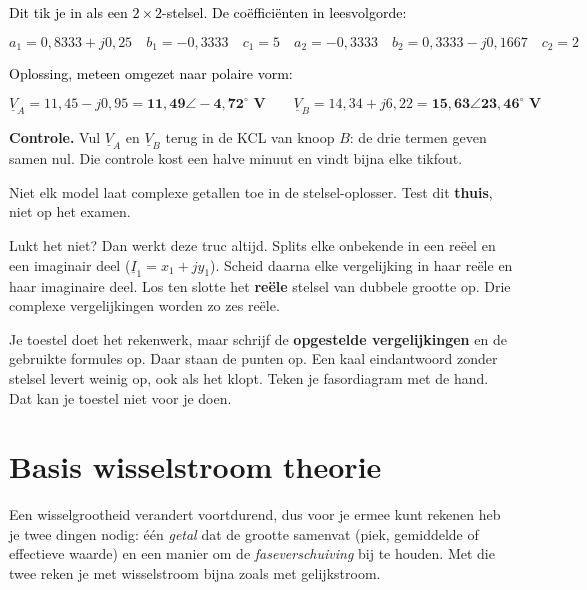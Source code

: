 \documentclass[a4paper,11pt]{article}
\newcommand{\stapreden}[1]{\par\vspace{1.4mm}\noindent\textcolor{black}{#1}\par\vspace{-2mm}}
\begin{document}
\begin{voorbeeld}
    \stapreden{Dit tik je in als een $2\times 2$-stelsel. De co\"effici\"enten in leesvolgorde:}
    \[a_1 = 0{,}8333+j0{,}25 \quad b_1 = -0{,}3333 \quad c_1 = 5 \quad
        a_2 = -0{,}3333 \quad b_2 = 0{,}3333-j0{,}1667 \quad c_2 = 2\]

    \stapreden{Oplossing, meteen omgezet naar polaire vorm:}
    \[\underline{V}_A = 11{,}45 - j0{,}95 = \mathbf{11{,}49\angle -4{,}72^\circ\text{ V}}
        \qquad
        \underline{V}_B = 14{,}34 + j6{,}22 = \mathbf{15{,}63\angle 23{,}46^\circ\text{ V}}\]

    \textbf{Controle.} Vul $\underline{V}_A$ en $\underline{V}_B$ terug in de KCL van knoop $B$:
    de drie termen geven samen nul. Die controle kost een halve minuut en vindt bijna elke tikfout.
\end{voorbeeld}

\begin{waarschuwing}
    Niet elk model laat complexe getallen toe in de stelsel-oplosser. Test dit \textbf{thuis}, niet
    op het examen.

    Lukt het niet? Dan werkt deze truc altijd. Splits elke onbekende in een re\"eel en een imaginair
    deel ($\underline{I}_1 = x_1 + jy_1$). Scheid daarna elke vergelijking in haar re\"ele en haar
    imaginaire deel. Los ten slotte het \textbf{re\"ele} stelsel van dubbele grootte op. Drie complexe
    vergelijkingen worden zo zes re\"ele.
\end{waarschuwing}

\begin{examenbox}
    Je toestel doet het rekenwerk, maar schrijf de \textbf{opgestelde vergelijkingen} en de gebruikte
    formules op. Daar staan de punten op. Een kaal eindantwoord zonder stelsel levert weinig op, ook
    als het klopt. Teken je fasordiagram met de hand. Dat kan je toestel niet voor je doen.
\end{examenbox}

\section{Basis wisselstroom theorie}

Een wisselgrootheid verandert voortdurend, dus voor je ermee kunt rekenen heb je twee dingen nodig:
\'e\'en \emph{getal} dat de grootte samenvat (piek, gemiddelde of effectieve waarde) en een manier
om de \emph{faseverschuiving} bij te houden. Met die twee reken je met wisselstroom bijna zoals met
gelijkstroom.
\end{document}
